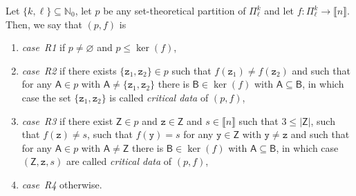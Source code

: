 \documentclass[10pt,a4paper]{amsart}
\numberwithin{equation}{section}
\newcommand{\nnint}{{\mathbb{N}_0}}
\newcommand{\dwi}[1]{\llbracket{#1}\rrbracket}
\newcommand{\xfromto}[3]{#1 \colon  #2 \to #3}
\newcommand{\tsopx}[2]{\Pi^{#1}_{#2}}
\newcommand{\finerthan}{\mathrel{\leq}}
\newcommand{\Yp}[1]{\mathtt{#1}}
\newcommand{\Yb}[1]{\mathsf{#1}}
\newcommand{\kerp}[1]{\ker(#1)}
\newcommand{\thedim}{n}
\newcommand{\scenarioone}{R1}
\newcommand{\scenariotwo}{R2}
\newcommand{\scenariothree}{R3}
\newcommand{\scenariofour}{R4}
\begin{document}
  \begin{Definition}
  \newcommand{\inlen}{k}
  \newcommand{\outlen}{\ell}
  \newcommand{\theind}{f}
  \newcommand{\theindx}[1]{f(#1)}
  \newcommand{\thepoint}{\Yp{z}}
  \newcommand{\thevalue}{s}
  \newcommand{\thepartition}{p}
  \newcommand{\thelong}{\Yb{Z}}
  \newcommand{\firstspecialpoint}{\Yp{z}_1}
  \newcommand{\secondspecialpoint}{\Yp{z}_2}
  \newcommand{\anypoint}{\Yp{y}}
  \newcommand{\someblock}{\Yb{B}}
  \newcommand{\anyblock}{\Yb{A}}
    Let $\{\inlen,\outlen\}\subseteq \nnint$, let $\thepartition$ be any set-theoretical partition of $\tsopx{\inlen}{\outlen}$ and let $\xfromto{\theind}{\tsopx{\inlen}{\outlen}}{\dwi{\thedim}}$. Then, we say that $(\thepartition,\theind)$ is
    \begin{enumerate}
    \item \emph{case~\scenarioone{}} if $\thepartition\neq \varnothing$ and $\thepartition\finerthan\kerp{\theind}$,
    \item \emph{case~\scenariotwo{}} if there exists $\{\firstspecialpoint,\secondspecialpoint\}\in\thepartition$  such that $\theindx{\firstspecialpoint}\neq\theindx{\secondspecialpoint}$ and such that for any $\anyblock\in\thepartition$ with $\anyblock\neq \{\firstspecialpoint,\secondspecialpoint\}$ there is $\someblock\in\kerp{\theind}$ with $\anyblock\subseteq \someblock$, in which case the set $\{\firstspecialpoint,\secondspecialpoint\}$ is called \emph{critical data} of $(\thepartition,\theind)$,
    \item \emph{case~\scenariothree{}} if there exist $\thelong\in\thepartition$ and $\thepoint\in\thelong$ and $\thevalue\in\dwi{\thedim}$ such that $3\leq |\thelong|$, such that $\theindx{\thepoint}\neq \thevalue$, such that $\theindx{\anypoint}= \thevalue$ for any $\anypoint\in\thelong$ with $\anypoint\neq \thepoint$ and such that for any $\anyblock\in\thepartition$ with $\anyblock\neq \thelong$ there is $\someblock\in\kerp{\theind}$ with $\anyblock\subseteq \someblock$, in which case  $(\thelong, \thepoint,\thevalue)$ are called \emph{critical data} of $(\thepartition,\theind)$,
    \item \emph{case~\scenariofour{}} otherwise.
    \end{enumerate}
  \end{Definition}
\end{document}
